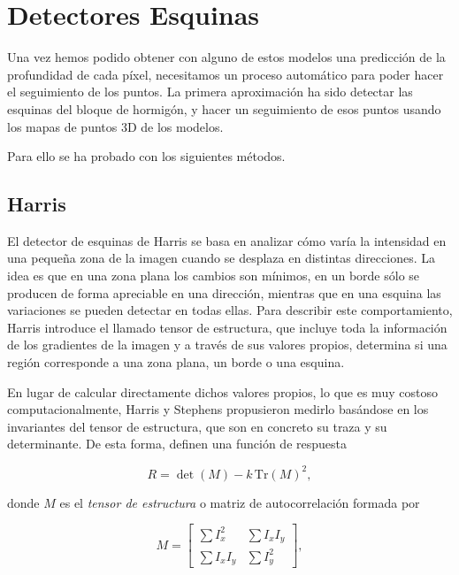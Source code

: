 
\section{Detectores Esquinas}
Una vez hemos podido obtener con alguno de estos modelos una predicción de la profundidad de cada píxel, necesitamos un proceso automático para poder hacer el seguimiento de los puntos. La primera aproximación ha sido detectar las esquinas del bloque de hormigón, y hacer un seguimiento de esos puntos usando los mapas de puntos 3D de los modelos.

Para ello se ha probado con los siguientes métodos.

\subsection{Harris}

El detector de esquinas de Harris \cite{harris1988combined} se basa en analizar cómo varía la intensidad en una pequeña zona de la imagen cuando se desplaza en distintas direcciones. La idea es que en una zona plana los cambios son mínimos, en un borde sólo se producen de forma apreciable en una dirección, mientras que en una esquina las variaciones se pueden detectar en todas ellas. Para describir este comportamiento, Harris introduce el llamado tensor de estructura, que incluye toda la información de los gradientes de la imagen y a través de sus valores propios, determina si una región corresponde a una zona plana, un borde o una esquina. 

En lugar de calcular directamente dichos valores propios, lo que es muy costoso computacionalmente, Harris y Stephens propusieron medirlo basándose en los invariantes del tensor de estructura, que son en concreto su traza y su determinante. De esta forma, definen una función de respuesta

\[
R = \det(M) - k \, \mathrm{Tr}(M)^2,
\]

donde \(M\) es el \emph{tensor de estructura} o matriz de autocorrelación formada por 

\[
M = 
\begin{bmatrix}
	\sum I_x^2 & \sum I_x I_y \\
	\sum I_x I_y & \sum I_y^2
\end{bmatrix},
\]

